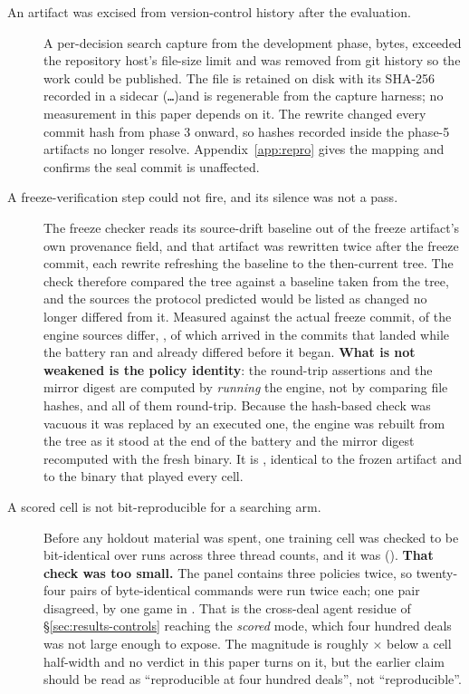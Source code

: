 \begin{description}
\item[An artifact was excised from version-control history after the evaluation.] A per-decision
  search capture from the development phase, \vsevenKfiveBytes{} bytes, exceeded the repository
  host's file-size limit and was removed from git history so the work could be published. The file is
  retained on disk with its SHA-256 recorded in a sidecar
  (\texttt{\vsevenKfiveDigest{}\ldots})\@ and is regenerable from the capture harness; no measurement in
  this paper depends on it. The rewrite changed every commit hash from phase 3 onward, so hashes
  recorded inside the phase-5 artifacts no longer resolve.
  Appendix~\ref{app:repro} gives the mapping and confirms the seal commit is unaffected.
\end{description}
\begin{description}

\item[A freeze-verification step could not fire, and its silence was not a pass.] The freeze checker reads its source-drift baseline out of the freeze artifact's own
  provenance field, and that artifact was rewritten twice after the freeze commit, each rewrite
  refreshing the baseline to the then-current tree. The check therefore compared the tree against a
  baseline taken from the tree, and the sources the protocol predicted would be listed as changed no
  longer differed from it. Measured against the actual freeze commit, \vsevenDriftChanged{} of the
  \vsevenDriftTotal{} engine sources differ, \vsevenDriftList{}, of which
  \vsevenDriftMidBattery{} arrived in the commits that landed while the battery ran and
  \vsevenDriftPreBattery{} already differed before it began. \textbf{What is not weakened is the policy identity}: the round-trip assertions and the
  mirror digest are computed by \emph{running} the engine, not by comparing file hashes, and all of
  them round-trip. Because the hash-based check was vacuous it was replaced by an executed one, the
  engine was rebuilt from the tree as it stood at the end of the battery and the mirror digest
  recomputed with the fresh binary. It is \texttt{\vsevenMirrorDigest{}}, identical to the frozen
  artifact and to the binary that played every cell.

\item[A scored cell is not bit-reproducible for a searching arm.]
  \label{app:corrections-reproducibility}
  Before any holdout material was spent, one training cell was checked to be bit-identical over
  \vsevenReproRuns{} runs across three thread counts, and it was
  (\vsevenReproIdentical{}). \textbf{That check was too small.} The panel contains three policies
  twice, so twenty-four pairs of byte-identical commands were run twice each; one pair disagreed, by
  one game in \vsevenResidueGames{}. That is the cross-deal agent residue of \S\ref{sec:results-controls}
  reaching the \emph{scored} mode, which four hundred deals was not large enough to expose. The
  magnitude is roughly \vsevenResidueRatio$\times$ below a cell half-width and no verdict in this paper turns on
  it, but the earlier claim should be read as ``reproducible at four hundred deals'', not
  ``reproducible''.


\end{description}
